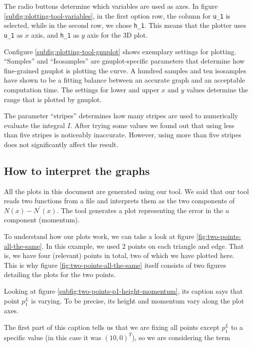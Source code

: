 \documentclass[a4paper, twoside]{article}
\begin{document}
The radio buttons determine which variables are used as axes. In figure \ref{subfig:plotting-tool-variables}, in the first option row, the column for \texttt{u\_1} is selected, while in the second row, we chose \texttt{h\_1}. This means that the plotter uses \texttt{u\_1} as $x$ axis, and \texttt{h\_1} as $y$ axis for the 3D plot.

Configure \ref{subfig:plotting-tool-gnuplot} shows exemplary settings for plotting. ``Samples'' and ``Isosamples'' are gnuplot-specific parameters that determine how fine-grained gnuplot is plotting the curve. A hundred samples and ten isosamples have shown to be a fitting balance between an accurate graph and an acceptable computation time. The settings for lower and upper $x$ and $y$ values determine the range that is plotted by gnuplot.

The parameter ``stripes'' determines how many stripes are used to numerically evaluate the integral $I$. After trying some values we found out that using less than five stripes is noticeably inaccurate. However, using more than five stripes does not significantly affect the result.

\subsection{How to interpret the graphs}
\label{sec:how-to-interpret-graphs}

All the plots in this document are generated using our tool. We said that our tool reads two functions from a file and interprets them as the two components of $N\left(x\right)-N^\prime\left(x\right)$. The tool generates a plot representing the error in the $u$ component (momentum).

To understand how our plots work, we can take a look at figure \ref{fig:two-points-all-the-same}. In this example, we used 2 points on each triangle and edge. That is, we have four (relevant) points in total, two of which we have plotted here. This is why figure \ref{fig:two-points-all-the-same} itself consists of two figures detailing the plots for the two points.

Looking at figure \ref{subfig:two-points-p1-height-momentum}, its caption says that point $p_1^L$ is varying. To be precise, its height and momentum vary along the plot axes.

The first part of this caption tells us that we are fixing all points except $p_1^L$ to a specific value (in this case it was $\left(10, 0\right)^T$), so we are considering the term
\end{document}
